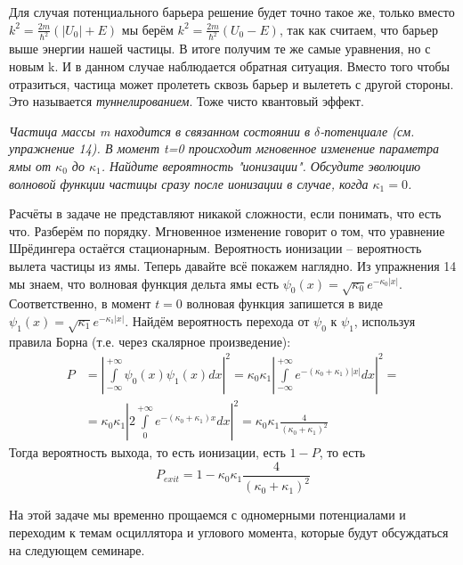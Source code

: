 Для случая потенциального барьера решение будет точно такое же, только вместо $ k^2 = \frac{2m}{\hbar^2}(|U_0| + E)$ мы берём $k^2 = \frac{2m}{\hbar^2}(U_0 - E)$, так как считаем, что барьер выше энергии нашей частицы. В итоге получим те же самые уравнения, но с новым k. И в данном случае наблюдается обратная ситуация. Вместо того чтобы отразиться, частица может пролететь сквозь барьер и вылететь с другой стороны. Это называется \textit{туннелированием}. Тоже чисто квантовый эффект.
\begin{center}
    \textit{Частица массы m находится в связанном состоянии в $\delta$-потенциале (см. упражнение 14). В момент t=0 происходит мгновенное изменение параметра ямы от $\kappa_0$ до $\kappa_1$. Найдите вероятность "ионизации". Обсудите эволюцию волновой функции частицы сразу после ионизации в случае, когда $\kappa_1=0$.}
\end{center}

Расчёты в задаче не представляют никакой сложности, если понимать, что есть что. Разберём по порядку. Мгновенное изменение говорит о том, что уравнение Шрёдингера остаётся стационарным. Вероятность ионизации – вероятность вылета частицы из ямы. Теперь давайте всё покажем наглядно. Из упражнения 14 мы знаем, что волновая функция дельта ямы есть $\psi_0(x) = \sqrt{\kappa_0}e^{-\kappa_0 |x|}$. Соответственно, в момент $t=0$ волновая функция запишется в виде $\psi_1(x) = \sqrt{\kappa_1}e^{-\kappa_1 |x|}$. Найдём вероятность перехода от $\psi_0$ к $\psi_1$, используя правила Борна (т.е. через скалярное произведение):
\begin{align*}
P &= \left|\int\limits_{-\infty}^{+\infty}\psi_0(x)\psi_1(x)dx\right|^2 = \kappa_0\kappa_1\left|\int\limits_{-\infty}^{+\infty} e^{-(\kappa_0 + \kappa_1)|x|}dx\right|^2 =\\
&= \kappa_0\kappa_1\left|2\int\limits_{0}^{+\infty} e^{-(\kappa_0 + \kappa_1)x}dx\right|^2 = \kappa_0\kappa_1\frac{4}{(\kappa_0 + \kappa_1)^2}
\end{align*}
Тогда вероятность выхода, то есть ионизации, есть $1 - P$, то есть
\[
P_{exit} = 1 - \kappa_0\kappa_1\frac{4}{(\kappa_0 + \kappa_1)^2}
\]

На этой задаче мы временно прощаемся с одномерными потенциалами и переходим к темам осциллятора и углового момента, которые будут обсуждаться на следующем семинаре. 